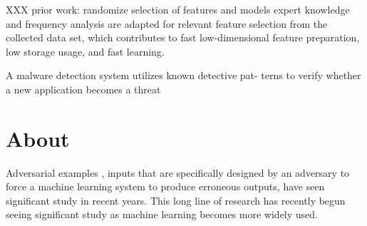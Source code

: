    
   XXX prior work: randomize selection of features and models 
   expert knowledge and frequency analysis are adapted for relevant feature selection from the collected data set, which contributes to fast low-dimensional feature preparation, low storage usage, and fast learning. 
   
A malware detection system utilizes known detective pat- terns to verify whether a new application becomes a threat

\section{About}

Adversarial examples \citep{szegedy2013intriguing,biggio2013evasion},
inputs that are specifically designed by an
adversary to force a machine learning system to produce erroneous outputs, 
have seen significant study in
recent years.
%
This long line of research
\citep{dalvi2004adversarial,lowd2005adversarial,barreno2006can,barreno2010security,globerson2006nightmare,kolcz2009feature,barreno2010security,biggio2010multiple,vsrndic2013detection}
has recently begun seeing significant study as machine learning
becomes more widely used.
%

